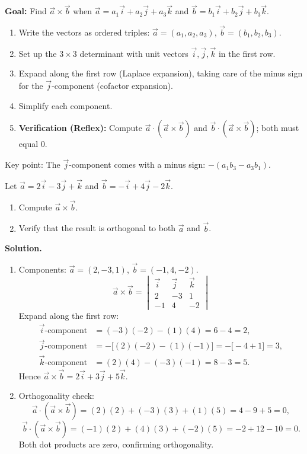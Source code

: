 \documentclass[11pt]{article}
\newcommand{\cle}[1]{{\popxbold\color{popdark}#1}}
\begin{document}
\begin{methode}
\textbf{Goal:} Find $\vec{a}\times\vec{b}$ when $\vec{a}=a_1\vec{i}+a_2\vec{j}+a_3\vec{k}$ and $\vec{b}=b_1\vec{i}+b_2\vec{j}+b_3\vec{k}$.
\begin{enumerate}
\item Write the vectors as ordered triples: $\vec{a}=(a_1,a_2,a_3)$, $\vec{b}=(b_1,b_2,b_3)$.
\item Set up the $3\times3$ determinant with unit vectors $\vec{i},\vec{j},\vec{k}$ in the first row.
\item Expand along the first row (Laplace expansion), taking care of the minus sign for the $\vec{j}$-component (cofactor expansion).
\item Simplify each component.
\item \textbf{Verification (Reflex):} Compute $\vec{a}\cdot(\vec{a}\times\vec{b})$ and $\vec{b}\cdot(\vec{a}\times\vec{b})$; both must equal $0$.
\end{enumerate}
\cle{Key point:} The $\vec{j}$-component comes with a minus sign: $-(a_1b_3-a_3b_1)$.
\end{methode}

\begin{exoresolu}
Let $\vec{a}=2\vec{i}-3\vec{j}+\vec{k}$ and $\vec{b}=-\vec{i}+4\vec{j}-2\vec{k}$.
\begin{enumerate}
\item Compute $\vec{a}\times\vec{b}$.
\item Verify that the result is orthogonal to both $\vec{a}$ and $\vec{b}$.
\end{enumerate}
\tcblower
\textbf{Solution.}
\begin{enumerate}
\item Components: $\vec{a}=(2,-3,1)$, $\vec{b}=(-1,4,-2)$.
\[
\vec{a}\times\vec{b}=
\begin{vmatrix}
\vec{i} & \vec{j} & \vec{k} \\
2 & -3 & 1 \\
-1 & 4 & -2
\end{vmatrix}
\]
Expand along the first row:
\begin{align*}
\vec{i}\text{-component} &= (-3)(-2)-(1)(4)=6-4=2,\\
\vec{j}\text{-component} &= -\bigl[(2)(-2)-(1)(-1)\bigr]=-\bigl[-4+1\bigr]=3,\\
\vec{k}\text{-component} &= (2)(4)-(-3)(-1)=8-3=5.
\end{align*}
Hence $\vec{a}\times\vec{b}=2\vec{i}+3\vec{j}+5\vec{k}$.
\item Orthogonality check:
\[
\vec{a}\cdot(\vec{a}\times\vec{b})=(2)(2)+(-3)(3)+(1)(5)=4-9+5=0,
\]
\[
\vec{b}\cdot(\vec{a}\times\vec{b})=(-1)(2)+(4)(3)+(-2)(5)=-2+12-10=0.
\]
Both dot products are zero, confirming orthogonality.
\end{enumerate}
\end{exoresolu}
\end{document}
